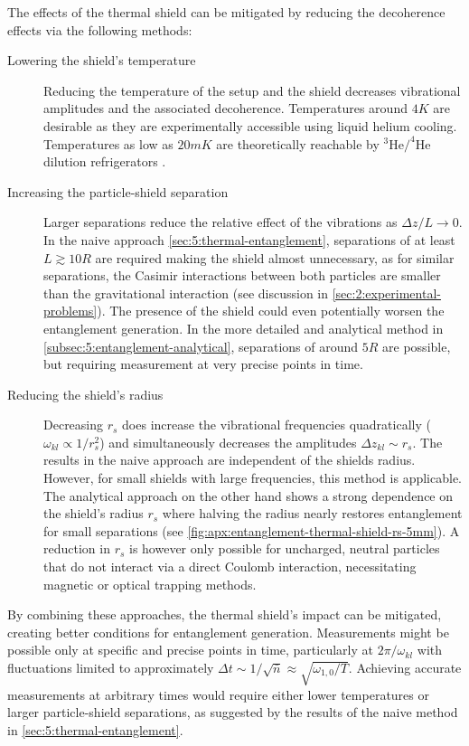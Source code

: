 The effects of the thermal shield can be mitigated by reducing the decoherence effects via the following methods:
\begin{description}
  \item[Lowering the shield's temperature] Reducing the temperature of the setup and the shield decreases vibrational amplitudes and the associated decoherence.
  Temperatures around $4\si{K}$ are desirable as they are experimentally accessible using liquid helium cooling. Temperatures as low as $20\si{mK}$ are theoretically reachable by $^3\mathrm{He}/^4\mathrm{He}$ dilution refrigerators \cite{Das_1965, Zu_2022}.

  \item[Increasing the particle-shield separation] Larger separations reduce the relative effect of the vibrations as $\Delta z / L \rightarrow 0$. In the naive approach \cref{sec:5:thermal-entanglement}, separations of at least $L \gtrsim 10 R$ are required making the shield almost unnecessary, as for similar separations, the Casimir interactions between both particles are smaller than the gravitational interaction (see discussion in \cref{sec:2:experimental-problems}). The presence of the shield could even potentially worsen the entanglement generation. In the more detailed and analytical method in \cref{subsec:5:entanglement-analytical}, separations of around $5R$ are possible, but requiring measurement at very precise points in time.
  
  \item[Reducing the shield's radius] Decreasing $r_s$ does increase the vibrational frequencies quadratically ($\omega_{kl} \propto 1/r_s^2$) and simultaneously decreases the amplitudes $\Delta z_{kl} \sim r_s$. The results in the naive approach are independent of the shields radius. However, for small shields with large frequencies, this method is applicable. The analytical approach on the other hand shows a strong dependence on the shield's radius $r_s$ where halving the radius nearly restores entanglement for small separations (see \cref{fig:apx:entanglement-thermal-shield-rs-5mm}). A reduction in $r_s$ is however only possible for uncharged, neutral particles that do not interact via a direct Coulomb interaction, necessitating magnetic or optical trapping methods.
\end{description}
By combining these approaches, the thermal shield's impact can be mitigated, creating better conditions for entanglement generation. Measurements might be possible only at specific and precise points in time, particularly at $2\pi/\omega_{kl}$ with fluctuations limited to approximately $\Delta t \sim 1/\sqrt{\bar{n}} \approx \sqrt{\omega_{1,0} / T}$.
Achieving accurate measurements at arbitrary times would require either lower temperatures or larger particle-shield separations, as suggested by the results of the naive method in \cref{sec:5:thermal-entanglement}.

